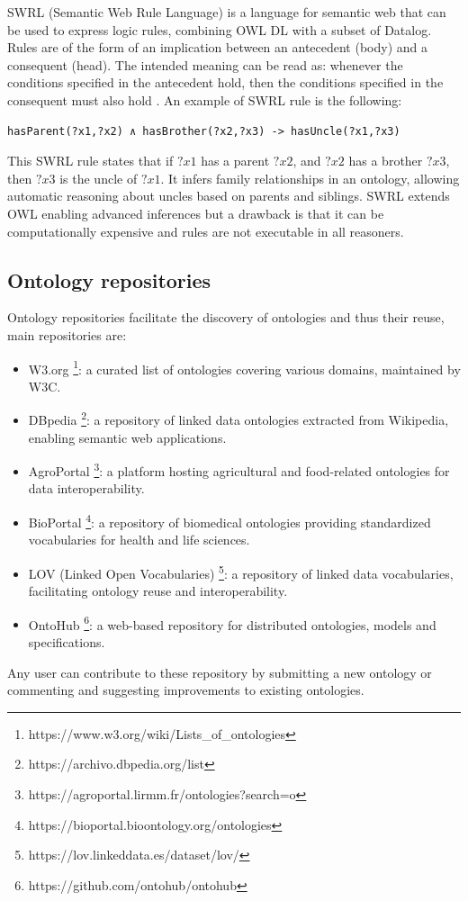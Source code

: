 SWRL (Semantic Web Rule Language) is a language for semantic web that can be used to express logic rules, combining OWL DL with a subset of Datalog. Rules are of the form of an implication between an antecedent (body) and a consequent (head). The intended meaning can be read as: whenever the conditions specified in the antecedent hold, then the conditions specified in the consequent must also hold \cite{swrl_wiki}. An example of SWRL rule is the following:
\begin{lstlisting}
hasParent(?x1,?x2) ∧ hasBrother(?x2,?x3) -> hasUncle(?x1,?x3)
\end{lstlisting}
This SWRL rule states that if $?x1$ has a parent $?x2$, and $?x2$ has a brother $?x3$, then $?x3$ is the uncle of $?x1$. It infers family relationships in an ontology, allowing automatic reasoning about uncles based on parents and siblings.
SWRL extends OWL enabling advanced inferences but a drawback is that it can be computationally expensive and rules are not executable in all reasoners.

\subsection{Ontology repositories}
Ontology repositories facilitate the discovery of ontologies and thus their reuse, main repositories are:
\begin{itemize}
    \item W3.org \footnote{https://www.w3.org/wiki/Lists\_of\_ontologies}: a curated list of ontologies covering various domains, maintained by W3C.

    \item DBpedia \footnote{https://archivo.dbpedia.org/list}: a repository of linked data ontologies extracted from Wikipedia, enabling semantic web applications.

    \item AgroPortal \footnote{https://agroportal.lirmm.fr/ontologies?search=o}: a platform hosting agricultural and food-related ontologies for data interoperability.

    \item BioPortal \footnote{https://bioportal.bioontology.org/ontologies}: a repository of biomedical ontologies providing standardized vocabularies for health and life sciences.

    \item LOV (Linked Open Vocabularies) \footnote{https://lov.linkeddata.es/dataset/lov/}: a repository of linked data vocabularies, facilitating ontology reuse and interoperability.


    \item OntoHub \footnote{https://github.com/ontohub/ontohub}: a web-based repository for distributed ontologies, models and specifications.
\end{itemize}
Any user can contribute to these repository by submitting a new ontology or commenting and suggesting improvements to existing ontologies.



